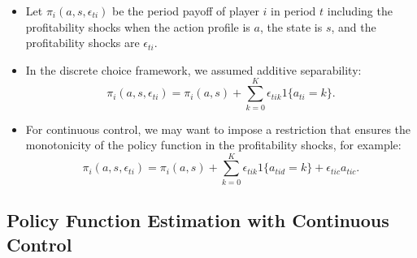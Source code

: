 \documentclass[
]{book}
\providecommand{\tightlist}{%
  \setlength{\itemsep}{0pt}\setlength{\parskip}{0pt}}
\begin{document}
\begin{itemize}
\tightlist
\item
  Let \(\pi_i(a, s, \epsilon_{ti})\) be the period payoff of player \(i\)
  in period \(t\) including the profitability shocks when the action
  profile is \(a\), the state is \(s\), and the profitability shocks are
  \(\epsilon_{ti}\).
\item
  In the discrete choice framework, we assumed additive separability:
  \begin{equation}
  \pi_i(a, s, \epsilon_{ti}) = \pi_i(a, s) + \sum_{k = 0}^K \epsilon_{tik}1\{a_{ti} = k\}.
  \end{equation}
\item
  For continuous control, we may want to impose a restriction that
  ensures the monotonicity of the policy function in the profitability
  shocks, for example: \begin{equation}
  \pi_i(a, s, \epsilon_{ti}) = \pi_i(a, s) + \sum_{k = 0}^K \epsilon_{tik} 1\{a_{tid} = k\} + \epsilon_{tic} a_{tic}.
  \end{equation}
\end{itemize}

\hypertarget{policy-function-estimation-with-continuous-control}{%
\subsection{Policy Function Estimation with Continuous Control}\label{policy-function-estimation-with-continuous-control}}
\end{document}
